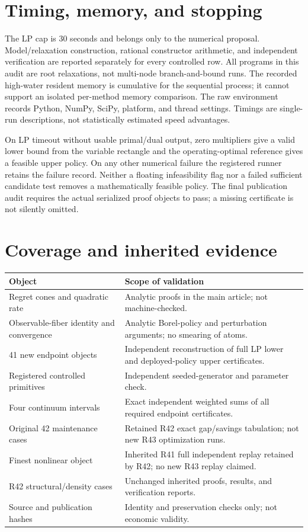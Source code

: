 \section{Timing, memory, and stopping}
The LP cap is 30 seconds and belongs only to the numerical proposal. Model/relaxation construction, rational constructor arithmetic, and independent verification are reported separately for every controlled row. All programs in this audit are root relaxations, not multi-node branch-and-bound runs. The recorded high-water resident memory is cumulative for the sequential process; it cannot support an isolated per-method memory comparison. The raw environment records Python, NumPy, SciPy, platform, and thread settings. Timings are single-run descriptions, not statistically estimated speed advantages.

On LP timeout without usable primal/dual output, zero multipliers give a valid lower bound from the variable rectangle and the operating-optimal reference gives a feasible upper policy. On any other numerical failure the registered runner retains the failure record. Neither a floating infeasibility flag nor a failed sufficient candidate test removes a mathematically feasible policy. The final publication audit requires the actual serialized proof objects to pass; a missing certificate is not silently omitted.

\section{Coverage and inherited evidence}
\begin{center}\small
\begin{tabular}{p{}p{}}
\toprule Object&Scope of validation\\\midrule
Regret cones and quadratic rate&Analytic proofs in the main article; not machine-checked.\\
Observable-fiber identity and convergence&Analytic Borel-policy and perturbation arguments; no smearing of atoms.\\
41 new endpoint objects&Independent reconstruction of full LP lower and deployed-policy upper certificates.\\
Registered controlled primitives&Independent seeded-generator and parameter check.\\
Four continuum intervals&Exact independent weighted sums of all required endpoint certificates.\\
Original 42 maintenance cases&Retained R42 exact gap/savings tabulation; not new R43 optimization runs.\\
Finest nonlinear object&Inherited R41 full independent replay retained by R42; no new R43 replay claimed.\\
R42 structural/density cases&Unchanged inherited proofs, results, and verification reports.\\
Source and publication hashes&Identity and preservation checks only; not economic validity.\\\bottomrule
\end{tabular}
\end{center}

